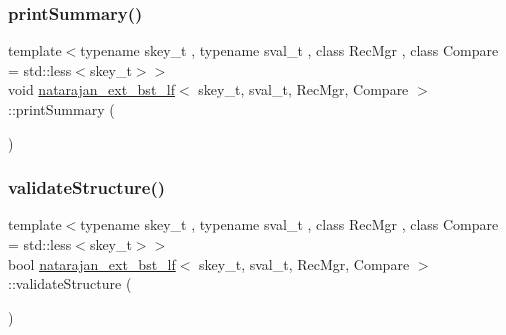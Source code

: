 \mbox{\label{classnatarajan__ext__bst__lf_a4d041c7fc819e57286e1907757a68895}} 
\subsubsection{\texorpdfstring{print\+Summary()}{printSummary()}\hspace{0.1cm}{\footnotesize\ttfamily [2/2]}}
{\footnotesize\ttfamily template$<$typename skey\+\_\+t , typename sval\+\_\+t , class Rec\+Mgr , class Compare  = std\+::less$<$skey\+\_\+t$>$$>$ \\
void \hyperlink{classnatarajan__ext__bst__lf}{natarajan\+\_\+ext\+\_\+bst\+\_\+lf}$<$ skey\+\_\+t, sval\+\_\+t, Rec\+Mgr, Compare $>$\+::print\+Summary (\begin{DoxyParamCaption}{ }\end{DoxyParamCaption})\hspace{0.3cm}{\ttfamily [inline]}}

\mbox{\label{classnatarajan__ext__bst__lf_a95852943b22caf6203a7c86b31d501be}} 
\subsubsection{\texorpdfstring{validate\+Structure()}{validateStructure()}\hspace{0.1cm}{\footnotesize\ttfamily [1/2]}}
{\footnotesize\ttfamily template$<$typename skey\+\_\+t , typename sval\+\_\+t , class Rec\+Mgr , class Compare  = std\+::less$<$skey\+\_\+t$>$$>$ \\
bool \hyperlink{classnatarajan__ext__bst__lf}{natarajan\+\_\+ext\+\_\+bst\+\_\+lf}$<$ skey\+\_\+t, sval\+\_\+t, Rec\+Mgr, Compare $>$\+::validate\+Structure (\begin{DoxyParamCaption}{ }\end{DoxyParamCaption})\hspace{0.3cm}{\ttfamily [inline]}}

